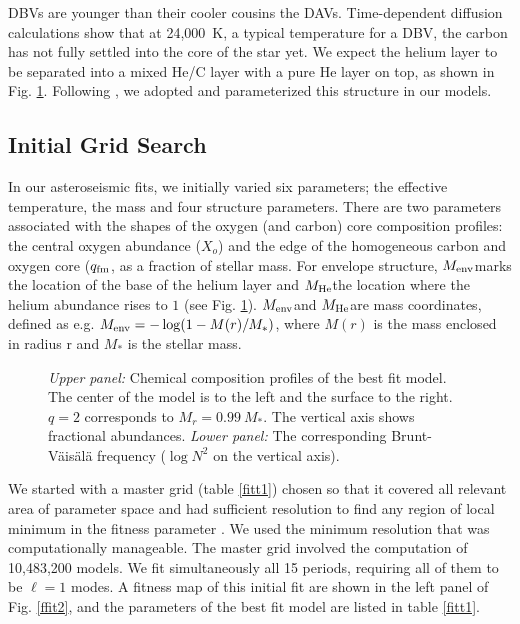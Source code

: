 \documentclass[12pt,preprint]{aastex}
\newcommand{\bvf}{Brunt-V\"ais\"al\"a }
\newcommand{\menv}{$M_{\rm env}$}
\newcommand{\mhe}{$M_{\rm He}$}
\newcommand{\xo}{$X_o$}
\newcommand{\qfm}{$q_{\rm fm}$}
\begin{document}
DBVs are younger than their cooler cousins the DAVs. Time-dependent diffusion calculations 
\citep[e.g.][]{Dehner95,Althaus05} show that at 24{,}000~K, a typical temperature for a DBV, 
the carbon has not fully settled into the core of the star yet. We expect the helium layer to 
be separated into a mixed He/C layer with a pure He layer on top, as shown in Fig. \ref{ffit1}. 
Following \citet{Metcalfe05a}, we adopted and parameterized this structure in our models. 

\subsection{Initial Grid Search}
\label{grids}

In our asteroseismic fits, we initially varied six parameters; the effective temperature, 
the mass and four structure parameters. There are two parameters associated with the shapes 
of the oxygen (and carbon) core composition profiles: the central oxygen abundance (\xo) and 
the edge of the homogeneous carbon and oxygen core (\qfm, as a fraction of stellar mass. 
For envelope structure, \menv marks the location of the base of the helium layer 
and \mhe the location where the helium abundance rises to $1$ (see Fig. \ref{ffit1}). 
\menv and \mhe are mass coordinates, defined as e.g. $M_{\rm env} = -\log(1 - M(r)/M_*)$, 
where $M(r)$ is the mass enclosed in radius r and $M_*$ is the stellar mass. 

\begin{figure}
\caption{
{\em Upper panel:} Chemical composition profiles of the best fit model. The center of the model is to the left and the surface to the right.  $q=2$ corresponds to $M_r = 0.99 \: M_*$. The vertical axis shows fractional abundances. 
{\em Lower panel:} The corresponding \bvf frequency ($\log{N^2}$ on the vertical axis). \label{ffit1}
}
\end{figure}

We started with a master grid (table \ref{fitt1}) chosen so that it covered all relevant 
area of parameter space and had sufficient resolution to find any region of local minimum in the fitness parameter \citep{Bischoff-Kim11a,Bischoff-Kim14}. We used the minimum resolution that was computationally manageable. The master grid involved the computation 
of 10,483,200 models. We fit simultaneously all 15 periods, requiring all of them to be $\ell=1$ 
modes. A fitness map of this initial fit are shown in the left panel of Fig. \ref{ffit2}, and the parameters of the best fit model are listed in table \ref{fitt1}.
\end{document}
